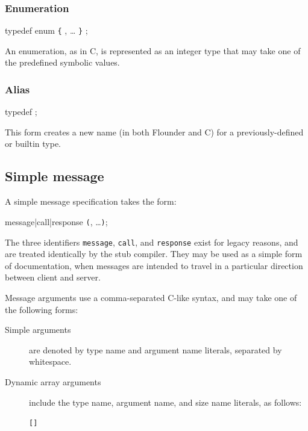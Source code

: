 \documentclass[a4paper,twoside]{report} %
\begin{document}
\subsubsection{Enumeration}

\begin{syntax}
typedef enum \verb+{+
  ,
  \ldots
\verb+}+ ;
\end{syntax}

An enumeration, as in C, is represented as an integer type that may take
one of the predefined symbolic values.

\subsubsection{Alias}

\begin{syntax}
typedef  ;
\end{syntax}

This form creates a new name (in both Flounder and C) for a
previously-defined or builtin type.


\subsection{Simple message}\label{sec:lang:message}

A simple message specification takes the form:

\begin{syntax}
message|call|response  \verb+(+, \ldots \verb+)+;
\end{syntax}

The three identifiers \texttt{message}, \texttt{call}, and \texttt{response}
exist for legacy reasons, and are treated identically by the stub compiler.
They may be used as a simple form of documentation, when messages are intended
to travel in a particular direction between client and server.

Message arguments use a comma-separated C-like syntax, and may take one of the
following forms:

\begin{description}
 \item[Simple arguments] are denoted by type name and argument name literals,
separated by whitespace.
 \item[Dynamic array arguments] include the type name, argument name, and size
name literals, as follows:
\begin{syntax}
 \verb+[+\verb+]+
\end{syntax}
\end{description}
\end{document}
